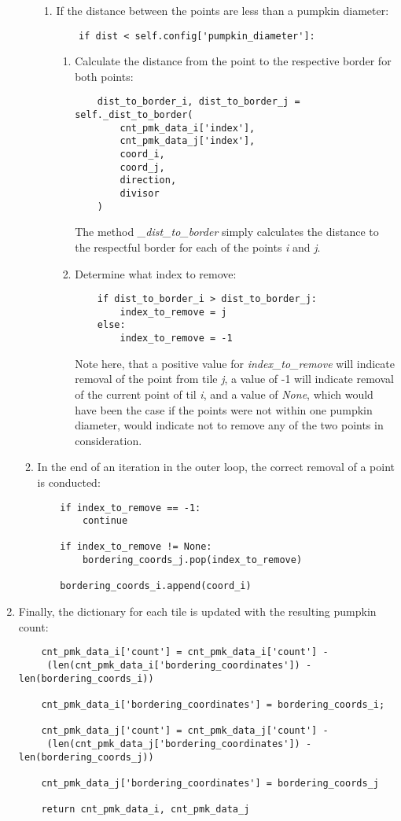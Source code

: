 \documentclass[../Head/Main.tex]{subfiles}
\begin{document}
\begin{enumerate}
\begin{enumerate}
\begin{enumerate}
\item If the distance between the points are less than a pumpkin diameter:
\begin{verbatim}
    if dist < self.config['pumpkin_diameter']:
\end{verbatim}
\begin{enumerate}
\item Calculate the distance from the point to the respective border for both points:
\begin{verbatim}
    dist_to_border_i, dist_to_border_j = self._dist_to_border(
        cnt_pmk_data_i['index'],
        cnt_pmk_data_j['index'],
        coord_i,
        coord_j,
        direction,
        divisor
    )
\end{verbatim}
The method \textit{\_dist\_to\_border} simply calculates the distance to the respectful border for each of the points \textit{i} and \textit{j}.
\item Determine what index to remove:
\begin{verbatim}
    if dist_to_border_i > dist_to_border_j:
        index_to_remove = j
    else:
        index_to_remove = -1
\end{verbatim}
Note here, that a positive value for \textit{index\_to\_remove} will indicate removal of the point from tile \textit{j}, a value of -1 will indicate removal of the current point of til \textit{i}, and a value of \textit{None}, which would have been the case if the points were not within one pumpkin diameter, would indicate not to remove any of the two points in consideration.
\end{enumerate}
\end{enumerate}
\item In the end of an iteration in the outer loop, the correct removal of a point is conducted:
\begin{verbatim}
    if index_to_remove == -1:
        continue

    if index_to_remove != None:
        bordering_coords_j.pop(index_to_remove)

    bordering_coords_i.append(coord_i)
\end{verbatim}
\end{enumerate}
\item Finally, the dictionary for each tile is updated with the resulting pumpkin count:
\begin{verbatim}
    cnt_pmk_data_i['count'] = cnt_pmk_data_i['count'] -
     (len(cnt_pmk_data_i['bordering_coordinates']) - len(bordering_coords_i))

    cnt_pmk_data_i['bordering_coordinates'] = bordering_coords_i;

    cnt_pmk_data_j['count'] = cnt_pmk_data_j['count'] -
     (len(cnt_pmk_data_j['bordering_coordinates']) - len(bordering_coords_j))

    cnt_pmk_data_j['bordering_coordinates'] = bordering_coords_j

    return cnt_pmk_data_i, cnt_pmk_data_j
\end{verbatim}
\end{enumerate}
\end{document}
